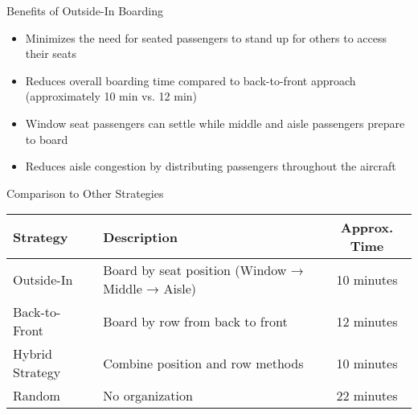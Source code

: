 \documentclass{article}
\begin{document}
\begin{center}
  \Large Benefits of Outside-In Boarding
\end{center}

\begin{itemize}
  \item Minimizes the need for seated passengers to stand up for others to access their seats
  \item Reduces overall boarding time compared to back-to-front approach (approximately 10 min vs. 12 min)
  \item Window seat passengers can settle while middle and aisle passengers prepare to board
  \item Reduces aisle congestion by distributing passengers throughout the aircraft
\end{itemize}

\begin{center}
  \Large Comparison to Other Strategies
\end{center}

\begin{tabular}{|l|p{5cm}|c|}
  \hline
  \textbf{Strategy} & \textbf{Description} & \textbf{Approx. Time} \\
  \hline
  Outside-In & Board by seat position (Window → Middle → Aisle) & 10 minutes \\
  Back-to-Front & Board by row from back to front & 12 minutes \\
  Hybrid Strategy & Combine position and row methods & 10 minutes \\
  Random & No organization & 22 minutes \\
  \hline
\end{tabular}
\end{document}
